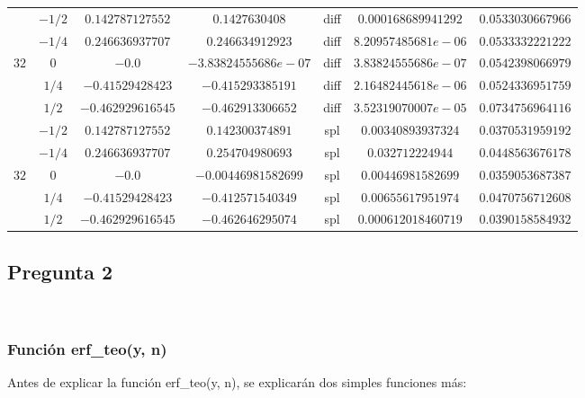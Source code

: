 \documentclass[letter, 10pt]{article}
\begin{document}
\begin{itemize}
\begin{center}
\begin{tabular}{|c|c|c|c|c|c|c|}
		\hline \hline
			& $ -1/2 $ & $ 0.142787127552 $ & $ 0.1427630408 $ &  diff  & $ 0.000168689941292 $ & $ 0.0533030667966 $ \\ 
			& $ -1/4 $ & $ 0.246636937707 $ & $ 0.246634912923 $ &  diff  & $ 8.20957485681e-06 $ & $ 0.0533332221222 $ \\ 
		$32$& $ 0 $ & $ -0.0 $ & $ -3.83824555686e-07 $ &  diff  & $ 3.83824555686e-07 $ & $ 0.0542398066979 $ \\ 
			& $ 1/4 $ & $ -0.41529428423 $ & $ -0.415293385191 $ &  diff  & $ 2.16482445618e-06 $ & $ 0.0524336951759 $ \\ 
			& $ 1/2 $ & $ -0.462929616545 $ & $ -0.462913306652 $ &  diff  & $ 3.52319070007e-05 $ & $ 0.0734756964116 $ \\
		\hline
		
			& $ -1/2 $ & $ 0.142787127552 $ & $ 0.142300374891 $ &  spl  & $ 0.00340893937324 $ & $ 0.0370531959192 $ \\ 
			& $ -1/4 $ & $ 0.246636937707 $ & $ 0.254704980693 $ &  spl  & $ 0.032712224944 $ & $ 0.0448563676178 $ \\ 
		$32$& $ 0 $ & $ -0.0 $ & $ -0.00446981582699 $ &  spl  & $ 0.00446981582699 $ & $ 0.0359053687387 $ \\ 
			& $ 1/4 $ & $ -0.41529428423 $ & $ -0.412571540349 $ &  spl  & $ 0.00655617951974 $ & $ 0.0470756712608 $ \\ 
			& $ 1/2 $ & $ -0.462929616545 $ & $ -0.462646295074 $ &  spl  & $ 0.000612018460719 $ & $ 0.0390158584932 $ \\

		\hline
	\end{tabular}
\end{center}

\end{itemize}

\subsection{Pregunta 2}\\
\subsubsection{Funci\'on erf\_teo(y, n)} Antes de explicar la funci\'on erf\_teo(y, n), se explicar\'an dos simples funciones m\'as:
\end{document}
